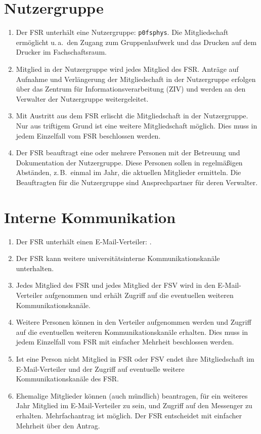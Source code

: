 \section{Nutzergruppe}
\begin{enumerate}
	\item Der FSR unterhält eine Nutzergruppe: \texttt{p0fsphys}.
	Die Mitgliedschaft ermöglicht u.\,a.\ den Zugang zum Gruppenlaufwerk und das Drucken auf dem Drucker im Fachschaftsraum.
	\item Mitglied in der Nutzergruppe wird jedes Mitglied des FSR.
	Anträge auf Aufnahme und Verlängerung der Mitgliedschaft in der Nutzergruppe erfolgen über das Zentrum für Informationsverarbeitung (ZIV) und werden an den Verwalter der Nutzergruppe weitergeleitet.
	\item Mit Austritt aus dem FSR erlischt die Mitgliedschaft in der Nutzergruppe.
	Nur aus triftigem Grund ist eine weitere Mitgliedschaft möglich.
	Dies muss in jedem Einzelfall vom FSR beschlossen werden.
	\item Der FSR beauftragt eine oder mehrere Personen mit der Betreuung und Dokumentation der Nutzergruppe.
	Diese Personen sollen in regelmäßigen Abständen, z.\,B.\ einmal im Jahr, die aktuellen Mitglieder ermitteln.
	Die Beauftragten für die Nutzergruppe sind Ansprechpartner für deren Verwalter.
\end{enumerate}

\section{Interne Kommunikation}
\begin{enumerate}
	\item Der FSR unterhält einen E-Mail-Verteiler: .
	\item Der FSR kann weitere universitätsinterne Kommunikationskanäle unterhalten.
	\item Jedes Mitglied des FSR und jedes Mitglied der FSV wird in den E-Mail-Verteiler aufgenommen und erhält Zugriff auf die eventuellen weiteren Kommunikationskanäle.
	\item Weitere Personen können in den Verteiler aufgenommen werden und Zugriff auf die eventuellen weiteren Kommunikationskanäle erhalten. Dies muss in jedem Einzelfall vom FSR mit einfacher Mehrheit beschlossen werden.
	\item Ist eine Person nicht Mitglied in FSR oder FSV endet ihre Mitgliedschaft im E-Mail-Verteiler und der Zugriff auf eventuelle weitere Kommunikationskanäle des FSR.
	\item Ehemalige Mitglieder können (auch mündlich) beantragen, für ein weiteres Jahr Mitglied im E-Mail-Verteiler zu sein, und Zugriff auf den Messenger zu erhalten.
		Mehrfachantrag ist möglich.
		Der FSR entscheidet mit einfacher Mehrheit über den Antrag.
\end{enumerate}

